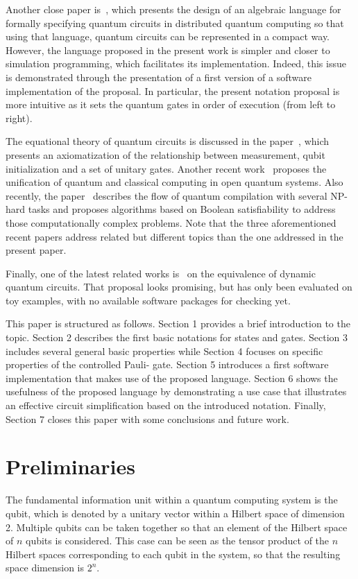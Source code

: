 \documentclass[sigconf,natbib=false]{acmart}
\begin{document}
Another close paper is~\cite{Ying}, which presents the design of an algebraic language for formally specifying quantum circuits in distributed quantum computing so that using that language, quantum circuits can be represented in a compact way. However, the language proposed in the present work is simpler and closer to simulation programming, which facilitates its implementation. Indeed, this issue is demonstrated through the presentation of a first version of a software implementation of the proposal. In particular, the present notation proposal is more intuitive as it sets the quantum gates in order of execution (from left to right).

The equational theory of quantum circuits is discussed in the paper~\cite{Staton}, which presents an axiomatization of the relationship between measurement, qubit initialization and a set of unitary gates. Another recent work~\cite{Wang19} proposes the unification of quantum and classical computing in open quantum systems.
Also recently, the paper~\cite{doi:10.1098/rsta.2019.0161} describes the flow of quantum compilation with several NP-hard tasks and proposes algorithms based on Boolean satisfiability to address those computationally complex problems. Note that the three  aforementioned recent papers address related but different topics than the one addressed in the present paper.

Finally, one of the latest related  works is~\cite{Wang21} on the equivalence of dynamic quantum circuits. That proposal looks promising, but has only been evaluated on toy examples, with no available software packages for  checking yet.

This paper is structured as follows. Section 1 provides a brief introduction to the topic. Section 2 describes the first basic notations for states and gates.  Section 3 includes several  general basic properties  while Section 4 focuses on specific properties of the controlled Pauli- gate. Section 5 introduces a first software implementation that makes use of the proposed language.
Section 6 shows the usefulness of the proposed language by demonstrating a use case that   illustrates an effective circuit simplification based on the introduced notation.
Finally, Section 7 closes this paper with some conclusions and future work.

\section{Preliminaries}
The fundamental information unit within a quantum computing system is the qubit, which is denoted by a unitary vector within a Hilbert space of dimension 2.
Multiple qubits can be taken together so that an element of the Hilbert space of $n$ qubits is considered. This case can be seen as the tensor product of the $n$ Hilbert spaces corresponding to each qubit in the system, so that the resulting space dimension is $2^n$.
\end{document}
